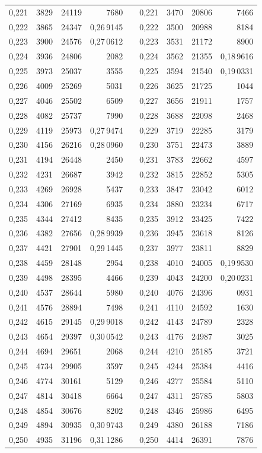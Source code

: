 \begin{tabular}{|c|c|c|r|@{}p{9pt}@{}|c|c|c|r|}
0,221 & 3829 & 24119 & 7680 &  & 0,221 & 3470 & 20806 & 7466 \\
0,222 & 3865 & 24347 & 0,26\,9145 &  & 0,222 & 3500 & 20988 & 8184 \\
0,223 & 3900 & 24576 & 0,27\,0612 &  & 0,223 & 3531 & 21172 & 8900 \\
0,224 & 3936 & 24806 & 2082 &  & 0,224 & 3562 & 21355 & 0,18\,9616 \\
0,225 & 3973 & 25037 & 3555 &  & 0,225 & 3594 & 21540 & 0,19\,0331 \\[3pt]
0,226 & 4009 & 25269 & 5031 &  & 0,226 & 3625 & 21725 & 1044 \\
0,227 & 4046 & 25502 & 6509 &  & 0,227 & 3656 & 21911 & 1757 \\
0,228 & 4082 & 25737 & 7990 &  & 0,228 & 3688 & 22098 & 2468 \\
0,229 & 4119 & 25973 & 0,27\,9474 &  & 0,229 & 3719 & 22285 & 3179 \\
0,230 & 4156 & 26216 & 0,28\,0960 &  & 0,230 & 3751 & 22473 & 3889 \\[3pt]
0,231 & 4194 & 26448 & 2450 &  & 0,231 & 3783 & 22662 & 4597 \\
0,232 & 4231 & 26687 & 3942 &  & 0,232 & 3815 & 22852 & 5305 \\
0,233 & 4269 & 26928 & 5437 &  & 0,233 & 3847 & 23042 & 6012 \\
0,234 & 4306 & 27169 & 6935 &  & 0,234 & 3880 & 23234 & 6717 \\
0,235 & 4344 & 27412 & 8435 &  & 0,235 & 3912 & 23425 & 7422 \\[3pt]
0,236 & 4382 & 27656 & 0,28\,9939 &  & 0,236 & 3945 & 23618 & 8126 \\
0,237 & 4421 & 27901 & 0,29\,1445 &  & 0,237 & 3977 & 23811 & 8829 \\
0,238 & 4459 & 28148 & 2954 &  & 0,238 & 4010 & 24005 & 0,19\,9530 \\
0,239 & 4498 & 28395 & 4466 &  & 0,239 & 4043 & 24200 & 0,20\,0231 \\
0,240 & 4537 & 28644 & 5980 &  & 0,240 & 4076 & 24396 & 0931 \\[3pt]
0,241 & 4576 & 28894 & 7498 &  & 0,241 & 4110 & 24592 & 1630 \\
0,242 & 4615 & 29145 & 0,29\,9018 &  & 0,242 & 4143 & 24789 & 2328 \\
0,243 & 4654 & 29397 & 0,30\,0542 &  & 0,243 & 4176 & 24987 & 3025 \\
0,244 & 4694 & 29651 & 2068 &  & 0,244 & 4210 & 25185 & 3721 \\
0,245 & 4734 & 29905 & 3597 &  & 0,245 & 4244 & 25384 & 4416 \\[3pt]
0,246 & 4774 & 30161 & 5129 &  & 0,246 & 4277 & 25584 & 5110 \\
0,247 & 4814 & 30418 & 6664 &  & 0,247 & 4311 & 25785 & 5803 \\
0,248 & 4854 & 30676 & 8202 &  & 0,248 & 4346 & 25986 & 6495 \\
0,249 & 4894 & 30935 & 0,30\,9743 &  & 0,249 & 4380 & 26188 & 7186 \\
0,250 & 4935 & 31196 & 0,31\,1286 &  & 0,250 & 4414 & 26391 & 7876 \\
\hline
\end{tabular}\par
